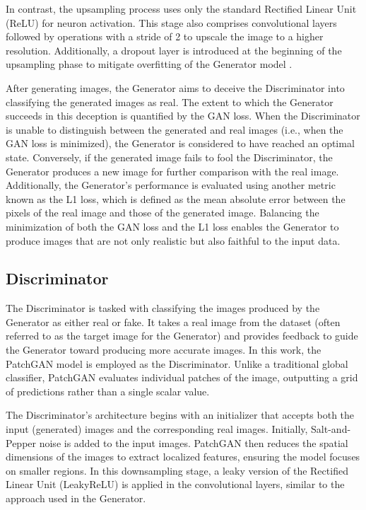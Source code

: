 In contrast, the upsampling process uses only the standard Rectified Linear Unit (ReLU) for neuron activation. This stage also comprises convolutional layers followed by operations with a stride of 2 to upscale the image to a higher resolution. Additionally, a dropout layer is introduced at the beginning of the upsampling phase to mitigate overfitting of the Generator model \citep{isola2017image}.

After generating images, the Generator aims to deceive the Discriminator into classifying the generated images as real. The extent to which the Generator succeeds in this deception is quantified by the GAN loss. When the Discriminator is unable to distinguish between the generated and real images (i.e., when the GAN loss is minimized), the Generator is considered to have reached an optimal state. Conversely, if the generated image fails to fool the Discriminator, the Generator produces a new image for further comparison with the real image. Additionally, the Generator's performance is evaluated using another metric known as the L1 loss, which is defined as the mean absolute error between the pixels of the real image and those of the generated image. Balancing the minimization of both the GAN loss and the L1 loss enables the Generator to produce images that are not only realistic but also faithful to the input data. 

\subsection{Discriminator}
The Discriminator is tasked with classifying the images produced by the Generator as either real or fake. It takes a real image from the dataset (often referred to as the target image for the Generator) and provides feedback to guide the Generator toward producing more accurate images. In this work, the PatchGAN model \citep{isola2017image} is employed as the Discriminator. Unlike a traditional global classifier, PatchGAN evaluates individual patches of the image, outputting a grid of predictions rather than a single scalar value.

The Discriminator’s architecture begins with an initializer that accepts both the input (generated) images and the corresponding real images. Initially, Salt-and-Pepper noise is added to the input images. PatchGAN then reduces the spatial dimensions of the images to extract localized features, ensuring the model focuses on smaller regions. In this downsampling stage, a leaky version of the Rectified Linear Unit (LeakyReLU) is applied in the convolutional layers, similar to the approach used in the Generator.

